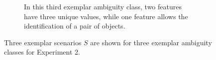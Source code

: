 \documentclass[11pt,a4paper]{article}
\begin{document}
\begin{figure}[!htb]
\begin{subfigure}{\linewidth}
\begin{subfigure}[t]{0.3\linewidth}
		\end{subfigure}
		\caption{In this third exemplar ambiguity class, two features have three unique values, while one feature allows the identification of a pair of objects.}
	\end{subfigure}
	\caption{Three exemplar scenarios $S$ are shown for three exemplar ambiguity classes for Experiment 2.} 
	\label{fig:ambiguity-classes-exp2}
\end{figure}
\end{document}
